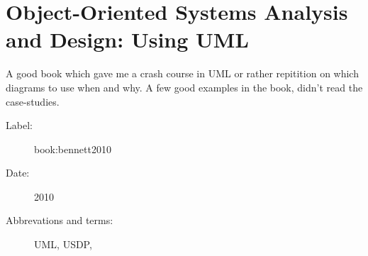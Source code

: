 \section{Object-Oriented Systems Analysis and Design: Using UML}
A good book which gave me a crash course in UML or rather repitition on which
diagrams to use when and why. A few good examples in the book, didn't read the
case-studies.

\begin{description}
    \item[Label:] book:bennett2010 \cite{book:bennett2010}
    \item[Date:] 2010
    \item[Abbrevations and terms:]
        UML,
        USDP,
\end{description}



